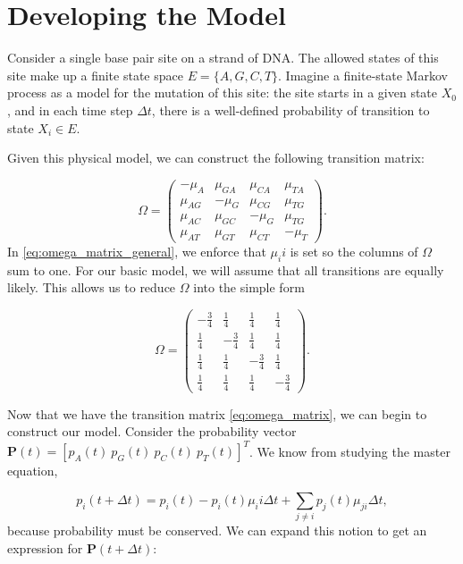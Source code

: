 \documentclass{article}
\begin{document}
	\section{Developing the Model}
		Consider a single base pair site on a strand of DNA. The allowed states of this site make up a finite state space $E = \{A, G, C, T\}$. Imagine a finite-state Markov process as a model for the mutation of this site: the site starts in a given state $X_0$, and in each time step $\Delta t$, there is a well-defined probability of transition to state $X_i \in E$. 
		
		Given this physical model, we can construct the following transition matrix:
		
		\begin{equation}
			\Omega = \begin{pmatrix}
				-\mu_A & \mu_{GA} & \mu_{CA} & \mu_{TA} \\
				\mu_{AG} & -\mu_G & \mu_{CG} & \mu_{TG} \\
				\mu_{AC} & \mu_{GC} & -\mu_G & \mu_{TG} \\
				\mu_{AT} & \mu_{GT} & \mu_{CT} & -\mu_T
			\end{pmatrix}.
			\label{eq:omega_matrix_general}
		\end{equation}
		In \eqref{eq:omega_matrix_general}, we enforce that $\mu_ii$ is set so the columns of $\Omega$ sum to one. For our basic model, we will assume that all transitions are equally likely. This allows us to reduce $\Omega$ into the simple form 
		
		\begin{equation}
		\Omega = \begin{pmatrix}
			-\frac{3}{4} & \frac{1}{4} & \frac{1}{4} & \frac{1}{4} \\
			\frac{1}{4} & -\frac{3}{4} & \frac{1}{4} & \frac{1}{4} \\
			\frac{1}{4} & \frac{1}{4} & -\frac{3}{4} & \frac{1}{4} \\
			\frac{1}{4} & \frac{1}{4} & \frac{1}{4} & -\frac{3}{4}
		\end{pmatrix}.
		\label{eq:omega_matrix}
		\end{equation}
		
		Now that we have the transition matrix \eqref{eq:omega_matrix}, we can begin to construct our model. Consider the probability vector $\mathbf{P}(t) = \left[p_A(t)\ p_G(t)\ p_C(t)\ p_T(t)\right]^T$. We know from studying the master equation,
		
		\begin{equation}
			p_i(t+\Delta t) = p_i(t) - p_i(t)\mu_ii\Delta t +\sum_{j\neq i}p_j(t)\mu_{ji}\Delta t,
			\label{eq:master_equation_one_base}
		\end{equation}
		because probability must be conserved. We can expand this notion to get an expression for $\mathbf{P}(t+\Delta t)$:
		
\end{document}
